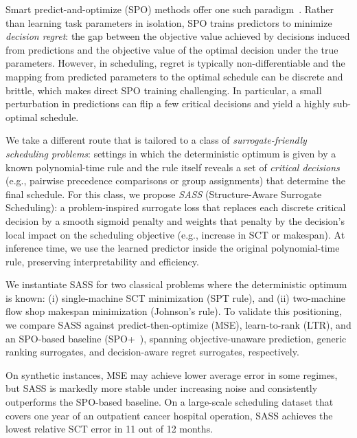 \documentclass{article}
\begin{document}
Smart predict-and-optimize (SPO) methods offer one such paradigm~\cite{elmachtoub2022smart}.
Rather than learning task parameters in isolation, SPO trains predictors to minimize \emph{decision regret}: the gap between the objective value achieved by decisions induced from predictions and the objective value of the optimal decision under the true parameters.
However, in scheduling, regret is typically non-differentiable and the mapping from predicted parameters to the optimal schedule can be discrete and brittle, which makes direct SPO training challenging.
In particular, a small perturbation in predictions can flip a few critical decisions and yield a highly sub-optimal schedule. 

We take a different route that is tailored to a class of \emph{surrogate-friendly scheduling problems}:
settings in which the deterministic optimum is given by a known polynomial-time rule and the rule itself reveals a set of \emph{critical decisions} (e.g., pairwise precedence comparisons or group assignments) that determine the final schedule.
For this class, we propose \emph{SASS} (Structure-Aware Surrogate Scheduling): a problem-inspired surrogate loss that replaces each discrete critical decision by a smooth sigmoid penalty and weights that penalty by the decision's local impact on the scheduling objective (e.g., increase in SCT or makespan).
At inference time, we use the learned predictor inside the original polynomial-time rule, preserving interpretability and efficiency.

We instantiate SASS for two classical problems where the deterministic optimum is known: (i) single-machine SCT minimization (SPT rule), and (ii) two-machine flow shop makespan minimization (Johnson's rule). 
To validate this positioning, we compare SASS against predict-then-optimize (MSE), learn-to-rank (LTR), and an SPO-based baseline (SPO+~\cite{elmachtoub2022smart}), spanning objective-unaware prediction, generic ranking surrogates, and decision-aware regret surrogates, respectively.


On synthetic instances, MSE may achieve lower average error in some regimes, but SASS is markedly more stable under increasing noise and consistently outperforms the SPO-based baseline.
On a large-scale scheduling dataset that covers one year of an outpatient cancer hospital operation, SASS achieves the lowest relative SCT error in 11 out of 12 months.
\end{document}
